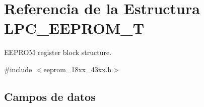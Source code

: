 \hypertarget{struct_l_p_c___e_e_p_r_o_m___t}{}\section{Referencia de la Estructura L\+P\+C\+\_\+\+E\+E\+P\+R\+O\+M\+\_\+T}
\label{struct_l_p_c___e_e_p_r_o_m___t}


E\+E\+P\+R\+OM register block structure.  




{\ttfamily \#include $<$eeprom\+\_\+18xx\+\_\+43xx.\+h$>$}

\subsection*{Campos de datos}
